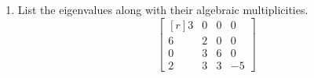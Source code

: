 \documentclass[12pt]{article}
\begin{document}
\begin{multicols*}{2}
\begin{enumerate}
		\item List the eigenvalues along with their algebraic multiplicities.
		\[
		\begin{bmatrix*}[r]
			3&0&0&0\\
			6&2&0&0\\
			0&3&6&0\\
			2&3&3&-5
		\end{bmatrix*}
		\]
		\vfill
	\end{enumerate}
\end{multicols*}

\end{document}
